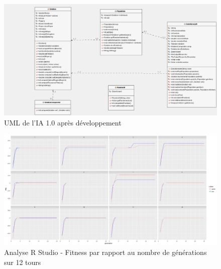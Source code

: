 \begin{figure}[h]
	\centering
	\includegraphics[width=1\linewidth]{images/UML_Himalaya_IA_1}
	\caption{UML de l'IA 1.0 après développement}
	\label{fig:UML_IA}
\end{figure}
\begin{figure}[h]
	\centering
	\includegraphics[width=1\linewidth]{images/analyseRStudio1}
	\caption{Analyse R Studio - Fitness par rapport au nombre de générations sur 12 tours }
	\label{fig:analyse1}
\end{figure}

